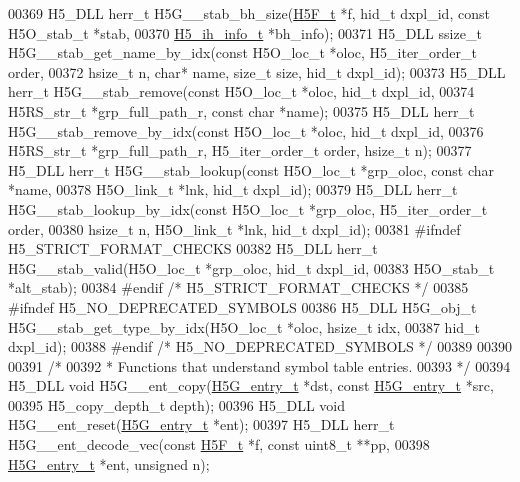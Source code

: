 \begin{DoxyCode}
00369 H5\_DLL herr\_t H5G\_\_stab\_bh\_size(\hyperlink{struct_h5_f__t}{H5F\_t} *f, hid\_t dxpl\_id, \textcolor{keyword}{const} H5O\_stab\_t *stab,
00370     \hyperlink{struct_h5__ih__info__t}{H5\_ih\_info\_t} *bh\_info);
00371 H5\_DLL ssize\_t H5G\_\_stab\_get\_name\_by\_idx(\textcolor{keyword}{const} H5O\_loc\_t *oloc, H5\_iter\_order\_t order,
00372     hsize\_t n, \textcolor{keywordtype}{char}* name, \textcolor{keywordtype}{size\_t} size, hid\_t dxpl\_id);
00373 H5\_DLL herr\_t H5G\_\_stab\_remove(\textcolor{keyword}{const} H5O\_loc\_t *oloc, hid\_t dxpl\_id,
00374     H5RS\_str\_t *grp\_full\_path\_r, \textcolor{keyword}{const} \textcolor{keywordtype}{char} *name);
00375 H5\_DLL herr\_t H5G\_\_stab\_remove\_by\_idx(\textcolor{keyword}{const} H5O\_loc\_t *oloc, hid\_t dxpl\_id,
00376     H5RS\_str\_t *grp\_full\_path\_r, H5\_iter\_order\_t order, hsize\_t n);
00377 H5\_DLL herr\_t H5G\_\_stab\_lookup(\textcolor{keyword}{const} H5O\_loc\_t *grp\_oloc, \textcolor{keyword}{const} \textcolor{keywordtype}{char} *name,
00378     H5O\_link\_t *lnk, hid\_t dxpl\_id);
00379 H5\_DLL herr\_t H5G\_\_stab\_lookup\_by\_idx(\textcolor{keyword}{const} H5O\_loc\_t *grp\_oloc, H5\_iter\_order\_t order,
00380     hsize\_t n, H5O\_link\_t *lnk, hid\_t dxpl\_id);
00381 \textcolor{preprocessor}{#ifndef H5\_STRICT\_FORMAT\_CHECKS}
00382 H5\_DLL herr\_t H5G\_\_stab\_valid(H5O\_loc\_t *grp\_oloc, hid\_t dxpl\_id,
00383     H5O\_stab\_t *alt\_stab);
00384 \textcolor{preprocessor}{#endif }\textcolor{comment}{/* H5\_STRICT\_FORMAT\_CHECKS */}\textcolor{preprocessor}{}
00385 \textcolor{preprocessor}{#ifndef H5\_NO\_DEPRECATED\_SYMBOLS}
00386 H5\_DLL H5G\_obj\_t H5G\_\_stab\_get\_type\_by\_idx(H5O\_loc\_t *oloc, hsize\_t idx,
00387     hid\_t dxpl\_id);
00388 \textcolor{preprocessor}{#endif }\textcolor{comment}{/* H5\_NO\_DEPRECATED\_SYMBOLS */}\textcolor{preprocessor}{}
00389 
00390 
00391 \textcolor{comment}{/*}
00392 \textcolor{comment}{ * Functions that understand symbol table entries.}
00393 \textcolor{comment}{ */}
00394 H5\_DLL \textcolor{keywordtype}{void} H5G\_\_ent\_copy(\hyperlink{struct_h5_g__entry__t}{H5G\_entry\_t} *dst, \textcolor{keyword}{const} \hyperlink{struct_h5_g__entry__t}{H5G\_entry\_t} *src,
00395             H5\_copy\_depth\_t depth);
00396 H5\_DLL \textcolor{keywordtype}{void} H5G\_\_ent\_reset(\hyperlink{struct_h5_g__entry__t}{H5G\_entry\_t} *ent);
00397 H5\_DLL herr\_t H5G\_\_ent\_decode\_vec(\textcolor{keyword}{const} \hyperlink{struct_h5_f__t}{H5F\_t} *f, \textcolor{keyword}{const} uint8\_t **pp,
00398                   \hyperlink{struct_h5_g__entry__t}{H5G\_entry\_t} *ent, \textcolor{keywordtype}{unsigned} n);

\end{DoxyCode}
